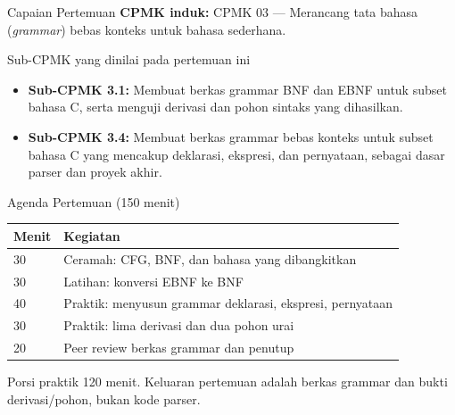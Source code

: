 \documentclass[aspectratio=169,10pt,t]{beamer}
\begin{document}

\begin{frame}{Capaian Pertemuan}
  \textbf{CPMK induk:} CPMK 03 --- Merancang tata bahasa
  (\textit{grammar}) bebas konteks untuk bahasa sederhana.

  \vspace{3pt}
  \begin{block}{Sub-CPMK yang dinilai pada pertemuan ini}
    \footnotesize
    \begin{itemize}
      \setlength{\itemsep}{2pt}
      \item \textbf{Sub-CPMK 3.1:} Membuat berkas grammar BNF dan EBNF
            untuk subset bahasa C, serta menguji derivasi dan pohon
            sintaks yang dihasilkan.
      \item \textbf{Sub-CPMK 3.4:} Membuat berkas grammar bebas konteks
            untuk subset bahasa C yang mencakup deklarasi, ekspresi,
            dan pernyataan, sebagai dasar parser dan proyek akhir.
    \end{itemize}
  \end{block}
\end{frame}

\begin{frame}{Agenda Pertemuan (150 menit)}
  \small
  \begin{tabular}{@{}p{1.4cm}p{12.3cm}@{}}
    \toprule
    \textbf{Menit} & \textbf{Kegiatan} \\
    \midrule
    30 & Ceramah: CFG, BNF, dan bahasa yang dibangkitkan \\
    30 & Latihan: konversi EBNF ke BNF \\
    40 & Praktik: menyusun grammar deklarasi, ekspresi, pernyataan \\
    30 & Praktik: lima derivasi dan dua pohon urai \\
    20 & Peer review berkas grammar dan penutup \\
    \bottomrule
  \end{tabular}

  \vspace{6pt}
  {\scriptsize\color{ubbblue!75}Porsi praktik 120 menit. Keluaran
  pertemuan adalah berkas grammar dan bukti derivasi/pohon, bukan kode
  parser.}
\end{frame}
\end{document}
